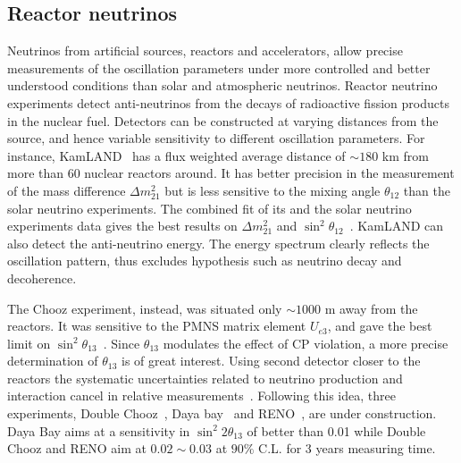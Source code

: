 \subsection{Reactor neutrinos}
\label{sec:reactor}
Neutrinos from artificial sources, reactors and accelerators, allow precise measurements of the oscillation parameters under more controlled and better understood conditions than solar and atmospheric neutrinos. Reactor neutrino experiments detect anti-neutrinos from the decays of radioactive fission products in the nuclear fuel. Detectors can be constructed at varying distances from the source, and hence variable sensitivity to different oscillation parameters. For instance, KamLAND~\cite{Kam03} has a flux weighted average distance of $\sim180$ km from more than 60 nuclear reactors around. It has better precision in the measurement of the mass difference $\Delta m^{2}_{21}$ but is less sensitive to the mixing angle $\theta_{12}$ than the solar neutrino experiments. The combined fit of its and the solar neutrino experiments data gives the best results on $\Delta m^{2}_{21}$ and $\sin^{2}\theta_{12}$~\cite{Kam08}. KamLAND can also detect the anti-neutrino energy. The energy spectrum clearly reflects the oscillation pattern, thus excludes hypothesis such as neutrino decay and decoherence.

The Chooz experiment, instead, was situated only $\sim1000$ m away from the reactors. It was sensitive to the PMNS matrix element $U_{e3}$, and gave the best limit on $\sin^{2}\theta_{13}$~\cite{Cho03}. Since $\theta_{13}$ modulates the effect of CP violation, a more precise determination of $\theta_{13}$ is of great interest. Using second detector closer to the reactors the systematic uncertainties related to neutrino production and interaction cancel in relative measurements~\cite{Koz03}. Following this idea, three experiments, Double Chooz~\cite{Dbc06}, Daya bay~\cite{Day07} and RENO~\cite{Ren08}, are under construction. Daya Bay aims at a sensitivity in $\sin^{2}2\theta_{13}$ of better than 0.01 while Double Chooz and RENO aim at $0.02 \sim 0.03$ at $90\%$ C.L. for 3 years measuring time.

